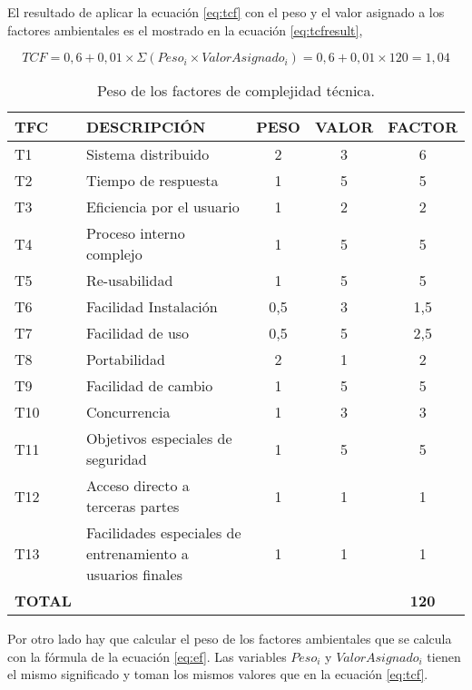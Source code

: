 \par El resultado de aplicar la ecuación \ref{eq:tcf} con el peso y el valor asignado a los factores ambientales es el mostrado en la ecuación \ref{eq:tcfresult},

\begin{equation} \label{eq:tcfresult}
  TCF = 0,6 + 0,01 \times \Sigma (Peso_i \times ValorAsignado_i) = 0,6 + 0,01 \times 120 = 1,04
\end{equation}

\begin{table}[h]
\begin{center}
\begin{tabular}{l l c c c}
\textbf{TFC} & \textbf{DESCRIPCIÓN} & \textbf{PESO} & \textbf{VALOR} & \textbf{FACTOR}\\ \hline \hline
T1	&	Sistema distribuido	&	2	&	3	&	6	\\
T2	&	Tiempo de respuesta	&	1	&	5	&	5	\\
T3	&	Eficiencia por el usuario	&	1	&	2	&	2	\\
T4	&	Proceso interno complejo	&	1	&	5	&	5	\\
T5	&	Re-usabilidad	&	1	&	5	&	5	\\
T6	&	Facilidad Instalación	&	0,5	&	3	&	1,5	\\
T7	&	Facilidad de uso	&	0,5	&	5	&	2,5	\\
T8	&	Portabilidad	&	2	&	1	&	2	\\
T9	&	Facilidad de cambio	&	1	&	5	&	5	\\
T10	&	Concurrencia	&	1	&	3	&	3	\\
T11	&	Objetivos especiales de seguridad	&	1	&	5	&	5	\\
T12	&	Acceso directo a terceras partes	&	1	&	1	&	1	\\
T13	&	Facilidades especiales de entrenamiento a usuarios finales	&	1	&	1	&	1	\\ \hline
\textbf{TOTAL} & & & & \textbf{120}\\ \hline \hline
\end{tabular}
\caption{Peso de los factores de complejidad técnica.}
\label{tab:tcf}
\end{center}
\end{table}

\par Por otro lado hay que calcular el peso de los factores ambientales que se calcula con la fórmula de la ecuación \ref{eq:ef}. Las variables $Peso_i$ y $ValorAsignado_i$ tienen el mismo significado y toman los mismos valores que en la ecuación \ref{eq:tcf}.

